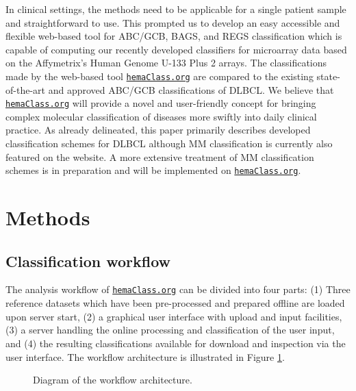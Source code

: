 \documentclass[10pt,letterpaper]{article}
\newcommand{\hemaClass}{\href{http://hemaClass.org}{\texttt{hemaClass.org}}}
\begin{document}
In clinical settings, the methods need to be applicable for a single patient sample and straightforward to use.
This prompted us to develop an easy accessible and flexible web-based tool for ABC/GCB, BAGS, and REGS classification which is capable of computing our recently developed classifiers for microarray data based on the Affymetrix's Human Genome U-133 Plus 2 arrays.
The classifications made by the web-based tool \hemaClass{} are compared to the existing state-of-the-art and approved ABC/GCB classifications of DLBCL.
We believe that \hemaClass{} will provide a novel and user-friendly concept for bringing complex molecular classification of diseases more swiftly into daily clinical practice.
As already delineated, this paper primarily describes developed classification schemes for DLBCL although MM classification is currently also featured on the website.
A more extensive treatment of MM classification schemes is in preparation and will be implemented on \hemaClass{}.

 
\section*{Methods}
\subsection*{Classification workflow}

The analysis workflow of \hemaClass{} can be divided into four parts:
(1) Three reference datasets which have been pre-processed and prepared offline are loaded upon server start,
(2) a graphical user interface with upload and input facilities,
(3) a server handling the online processing and classification of the user input, and
(4) the resulting classifications available for download and inspection via the user interface.
The workflow architecture is illustrated in Figure \ref{fig:webtooldiagram}.

\begin{figure}[!ht]
\caption{Diagram of the workflow architecture.}
\label{fig:webtooldiagram}
\end{figure}
\end{document}
